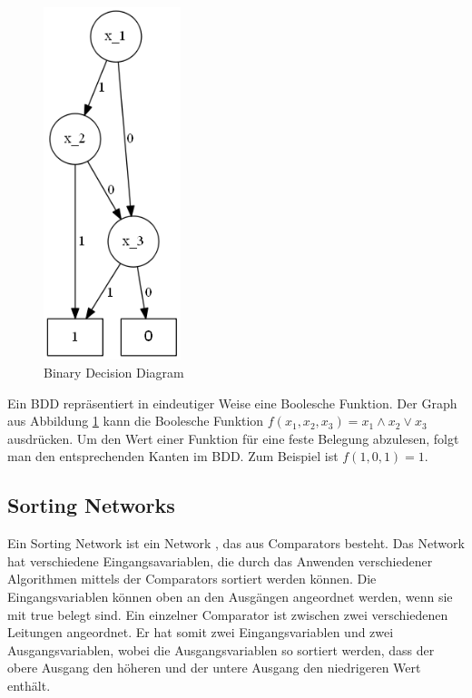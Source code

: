 \documentclass[a4,abstract=on]{scrartcl}
\begin{document}
\begin{figure}[H]
\centering
\includegraphics[width=4cm]{bdd.png}
\caption{Binary Decision Diagram}
\label{fig:bdd}
\end{figure}

Ein BDD repräsentiert in eindeutiger Weise eine Boolesche Funktion. Der Graph aus Abbildung \ref{fig:bdd} kann die Boolesche Funktion $f(x_1,x_2,x_3) = x_1\wedge x_2 \vee x_3$ ausdrücken. Um den Wert einer Funktion für eine feste Belegung abzulesen, folgt man den entsprechenden Kanten im BDD. Zum Beispiel ist $f(1,0,1)=1$.


\subsection{Sorting Networks}
Ein Sorting Network ist ein Network \cite[vgl.][]{sorting}, das aus Comparators besteht. Das Network hat verschiedene Eingangsavariablen, die durch das Anwenden verschiedener Algorithmen mittels der Comparators sortiert werden können. Die Eingangsvariablen können oben an den Ausgängen angeordnet werden, wenn sie mit true belegt sind. Ein einzelner Comparator ist zwischen zwei verschiedenen Leitungen angeordnet. Er hat somit zwei Eingangsvariablen und zwei Ausgangsvariablen, wobei die Ausgangsvariablen so sortiert werden, dass der obere Ausgang den höheren und der untere Ausgang den niedrigeren Wert enthält.
\end{document}
